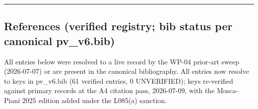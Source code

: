 \documentclass[
  11pt,
]{article}
\begin{document}
\begin{center}\rule{0.5\linewidth}{0.5pt}\end{center}

\subsection{References (verified registry; bib status per canonical
pv\_v6.bib)}\label{references-verified-registry-bib-status-per-canonical-pv_v6.bib}

All entries below were resolved to a live record by the WP-04 prior-art
sweep (2026-07-07) or are present in the canonical bibliography. All
entries now resolve to keys in pv\_v6.bib (61 verified entries, 0
UNVERIFIED); keys re-verified against primary records at the A4 citation
pass, 2026-07-09, with the Mosca-Piani 2025 edition added under the
L085(a) sanction.
\end{document}
